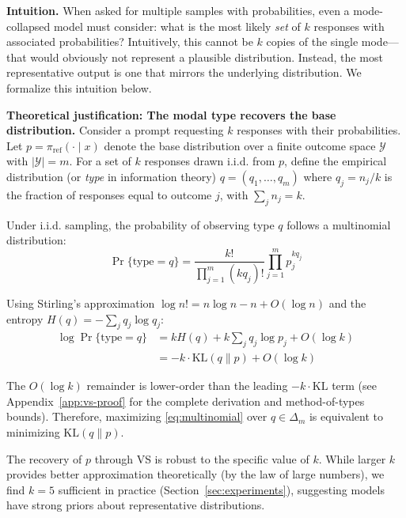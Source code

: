 \textbf{Intuition.} When asked for multiple samples with probabilities, even a mode-collapsed model must consider: what is the most likely \emph{set} of $k$ responses with associated probabilities? Intuitively, this cannot be $k$ copies of the single mode—that would obviously not represent a plausible distribution. Instead, the most representative output is one that mirrors the underlying distribution. We formalize this intuition below.

\textbf{Theoretical justification: The modal type recovers the base distribution.} Consider a prompt requesting $k$ responses with their probabilities. Let $p = \pi_\text{ref}(\cdot \mid x)$ denote the base distribution over a finite outcome space $\mathcal{Y}$ with $|\mathcal{Y}| = m$. For a set of $k$ responses drawn i.i.d. from $p$, define the empirical distribution (or \emph{type} in information theory) $q = (q_1, \ldots, q_m)$ where $q_j = n_j/k$ is the fraction of responses equal to outcome $j$, with $\sum_j n_j = k$.

Under i.i.d. sampling, the probability of observing type $q$ follows a multinomial distribution:
\begin{equation}
\Pr\{\text{type} = q\} = \frac{k!}{\prod_{j=1}^m (kq_j)!} \prod_{j=1}^m p_j^{kq_j}
\label{eq:multinomial}
\end{equation}

Using Stirling's approximation $\log n! = n\log n - n + O(\log n)$ and the entropy $H(q) = -\sum_j q_j \log q_j$:
\begin{align}
\log \Pr\{\text{type} = q\} &= k H(q) + k\sum_j q_j \log p_j + O(\log k)\\
&= -k \cdot \text{KL}(q \| p) + O(\log k)
\label{eq:kl-form}
\end{align}

The $O(\log k)$ remainder is lower-order than the leading $-k \cdot \text{KL}$ term (see Appendix~\ref{app:vs-proof} for the complete derivation and method-of-types bounds). Therefore, maximizing \eqref{eq:multinomial} over $q \in \Delta_m$ is equivalent to minimizing $\text{KL}(q \| p)$.

\begin{remark}
The recovery of $p$ through VS is robust to the specific value of $k$. While larger $k$ provides better approximation theoretically (by the law of large numbers), we find $k=5$ sufficient in practice (Section~\ref{sec:experiments}), suggesting models have strong priors about representative distributions.
\end{remark}

